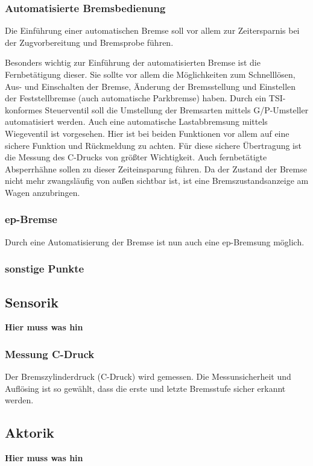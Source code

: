 \subsubsection{Automatisierte Bremsbedienung}
Die Einführung einer automatischen Bremse soll vor allem zur Zeitersparnis bei der Zugvorbereitung und \gls{Bremsprobe} führen.\par
Besonders wichtig zur Einführung der automatisierten Bremse ist die Fernbetätigung dieser. Sie sollte vor allem die Möglichkeiten zum Schnelllösen, Aus- und Einschalten der Bremse, Änderung der Bremsstellung und Einstellen der Feststellbremse (auch automatische Parkbremse) haben.
Durch ein TSI-konformes Steuerventil soll die Umstellung der Bremsarten mittels G/P-Umsteller automatisiert werden. Auch eine automatische Lastabbremsung mittels Wiegeventil ist vorgesehen. Hier ist bei beiden Funktionen vor allem auf eine sichere Funktion und Rückmeldung zu achten.
Für diese sichere Übertragung ist die Messung des C-Drucks von größter Wichtigkeit.
Auch fernbetätigte Absperrhähne sollen zu dieser Zeiteinsparung führen. 
Da der Zustand der Bremse nicht mehr zwangsläufig von außen sichtbar ist, ist eine Bremszustandsanzeige am Wagen anzubringen. 

\subsubsection{ep-Bremse}
Durch eine Automatisierung der Bremse ist nun auch eine ep-Bremsung möglich.

\subsubsection{sonstige Punkte}

\subsection{Sensorik}
\textbf{Hier muss was hin}
\subsubsection{Messung C-Druck}
Der Bremszylinderdruck (C-Druck) wird gemessen. 
Die Messunsicherheit und Auflösing ist so gewählt, dass die erste und letzte Bremsstufe %
sicher erkannt werden. %

\subsection{Aktorik}
\textbf{Hier muss was hin}
